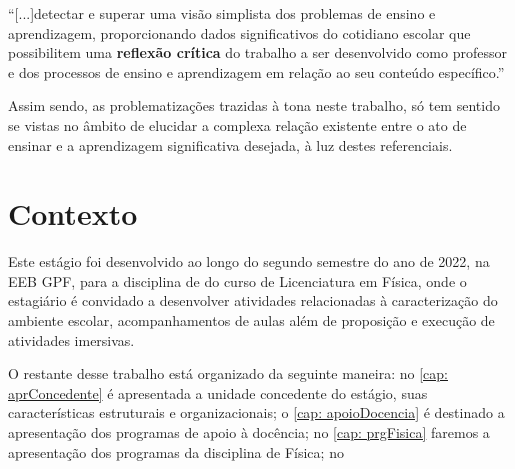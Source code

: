 \begin{citacao}
``[...]detectar e superar uma visão simplista dos problemas de ensino e aprendizagem, proporcionando dados significativos do cotidiano escolar que possibilitem uma \textbf{reflexão crítica} do trabalho a ser desenvolvido como professor e dos processos de ensino e aprendizagem em relação ao seu conteúdo específico.'' \cite[p. 11, \textbf{grifos meus}]{CARVALHO:2012} 
\end{citacao}
Assim sendo, as problematizações trazidas à tona neste trabalho, só tem sentido se vistas no âmbito de elucidar a complexa relação existente entre o ato de ensinar e a aprendizagem significativa desejada, à luz destes referenciais.

\section{Contexto}
Este estágio foi desenvolvido ao longo do segundo semestre do ano de 2022, na \ac{EEB} \ac{GPF}, para a disciplina de \disciplina \; do curso de Licenciatura em Física, onde o estagiário é convidado a desenvolver atividades relacionadas à caracterização do ambiente escolar, acompanhamentos de aulas além de proposição e execução de atividades imersivas.
 
O restante desse trabalho está organizado da seguinte maneira: no \autoref{cap: aprConcedente} é apresentada a unidade concedente do estágio, suas características estruturais e organizacionais; o \autoref{cap: apoioDocencia} é destinado a apresentação dos programas de apoio à docência; no \autoref{cap: prgFisica} faremos a apresentação dos programas da disciplina de Física; no 


